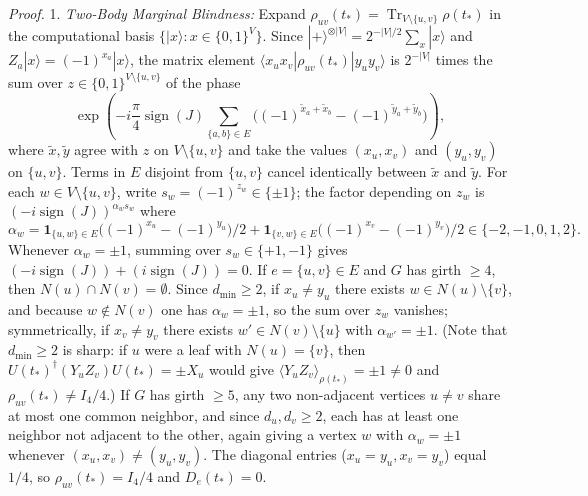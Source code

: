 \documentclass[
  11pt,
]{article}
\begin{document}
\emph{Proof.} 1. \emph{Two-Body Marginal Blindness:} Expand \(\rho_{uv}(t_*) = \operatorname{Tr}_{V\setminus\{u,v\}}\rho(t_*)\) in the computational basis \(\{|x\rangle : x\in\{0,1\}^V\}\). Since \(|+\rangle^{\otimes |V|} = 2^{-|V|/2}\sum_x |x\rangle\) and \(Z_a|x\rangle = (-1)^{x_a}|x\rangle\), the matrix element \(\langle x_u x_v|\rho_{uv}(t_*)|y_u y_v\rangle\) is \(2^{-|V|}\) times the sum over \(z \in \{0,1\}^{V\setminus\{u,v\}}\) of the phase
\[
\exp\!\left(-i\frac{\pi}{4}\operatorname{sign}(J)\sum_{\{a,b\}\in E}
\bigl((-1)^{\tilde x_a+\tilde x_b}-(-1)^{\tilde y_a+\tilde y_b}\bigr)\right),
\]
where \(\tilde x, \tilde y\) agree with \(z\) on \(V\setminus\{u,v\}\) and take the values \((x_u,x_v)\) and \((y_u,y_v)\) on \(\{u,v\}\). Terms in \(E\) disjoint from \(\{u,v\}\) cancel identically between \(\tilde x\) and \(\tilde y\). For each \(w \in V\setminus\{u,v\}\), write \(s_w = (-1)^{z_w} \in \{\pm 1\}\); the factor depending on \(z_w\) is \((-i\operatorname{sign}(J))^{\alpha_w s_w}\) where
\[
\alpha_w = \mathbf{1}_{\{u,w\}\in E}\bigl((-1)^{x_u} - (-1)^{y_u}\bigr)/2 + \mathbf{1}_{\{v,w\}\in E}\bigl((-1)^{x_v} - (-1)^{y_v}\bigr)/2 \in \{-2,-1,0,1,2\}.
\]
Whenever \(\alpha_w = \pm 1\), summing over \(s_w \in \{+1,-1\}\) gives \((-i\operatorname{sign}(J)) + (i\operatorname{sign}(J)) = 0\).
If \(e=\{u,v\}\in E\) and \(G\) has girth \(\ge 4\), then \(N(u)\cap N(v) = \emptyset\). Since \(d_{\min} \ge 2\), if \(x_u \ne y_u\) there exists \(w \in N(u)\setminus\{v\}\), and because \(w \notin N(v)\) one has \(\alpha_w = \pm 1\), so the sum over \(z_w\) vanishes; symmetrically, if \(x_v \ne y_v\) there exists \(w' \in N(v)\setminus\{u\}\) with \(\alpha_{w'} = \pm 1\). (Note that \(d_{\min}\ge 2\) is sharp: if \(u\) were a leaf with \(N(u)=\{v\}\), then \(U(t_*)^\dagger(Y_u Z_v)U(t_*) = \pm X_u\) would give \(\langle Y_u Z_v\rangle_{\rho(t_*)} = \pm 1 \ne 0\) and \(\rho_{uv}(t_*)\ne I_4/4\).) If \(G\) has girth \(\ge 5\), any two non-adjacent vertices \(u \ne v\) share at most one common neighbor, and since \(d_u, d_v \ge 2\), each has at least one neighbor not adjacent to the other, again giving a vertex \(w\) with \(\alpha_w = \pm 1\) whenever \((x_u,x_v) \ne (y_u,y_v)\). The diagonal entries (\(x_u=y_u, x_v=y_v\)) equal \(1/4\), so \(\rho_{uv}(t_*) = I_4/4\) and \(D_e(t_*) = 0\).
\end{document}
